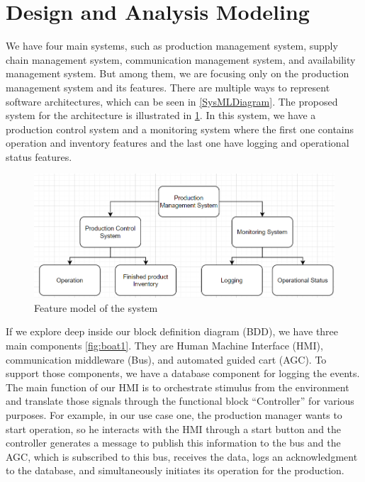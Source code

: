 \section{Design and Analysis Modeling}
\label{sec:design_and_analysis_modelling}
We have four main systems, such as production management system, supply chain management system, communication management system, and availability management system. But among them, we are focusing only on the production management system and its features. There are multiple ways to represent software architectures, which can be seen in \ref{SysMLDiagram}. The proposed system for the architecture is illustrated in \ref{Featuremodel}. In this system, we have a production control system and a monitoring system where the first one contains operation and inventory features and the last one have logging and operational status features.

\begin{figure}[h]
\centering
  \includegraphics[width=\linewidth]{images/featuremodel.png}
  \caption{Feature model of the system}
  \label{Featuremodel}
\end{figure}

If we explore deep inside our block definition diagram (BDD), we have three main components \ref{fig:boat1}. They are Human Machine Interface (HMI), communication middleware (Bus), and automated guided cart (AGC). To support those components, we have a database component for logging the events. The main function of our HMI is to orchestrate stimulus from the environment and translate those signals through the functional block “Controller” for various purposes. For example, in our use case one, the production manager wants to start operation, so he interacts with the HMI through a start button and the controller generates a message to publish this information to the bus and the AGC, which is subscribed to this bus, receives the data, logs an acknowledgment to the database, and simultaneously initiates its operation for the production. 


